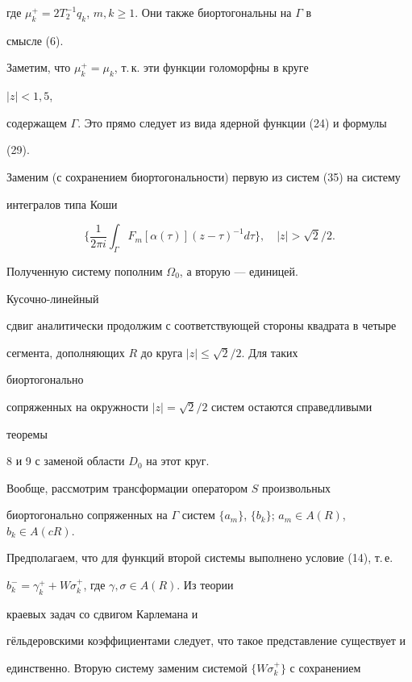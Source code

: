 где $\mu^+_k=2T^{-1}_2q_k$, $m,k\ge1$. Они также биортогональны на $\Gamma$ в 


смысле (6). 


Заметим, что $\mu^+_k=\mu_k$, т.\,к. эти функции голоморфны в круге 


$|z|<1,5$, 


содержащем $\Gamma$. Это прямо следует из вида ядерной функции (24) и формулы 


(29). 


Заменим (с сохранением биортогональности) первую из систем (35) на систему 


интегралов типа Коши 


$$ 


\bigg\{\frac{1}{2\pi i}\int_\Gamma F_m[\alpha(\tau)] 


(z-\tau)^{-1}d\tau\bigg\},\quad |z|>\sqrt{2}/2. 


$$ 


Полученную систему пополним $\Omega_0$, а вторую --- единицей. 


Кусочно-линейный 


сдвиг аналитически продолжим с соответствующей стороны квадрата в четыре 


сегмента, дополняющих $R$ до круга $|z|\le\sqrt{2}/2$. Для таких 


биортогонально 


сопряженных на окружности $|z|=\sqrt{2}/2$ систем остаются справедливыми 


теоремы 


8 и 9 с заменой области $D_0$ на этот круг. 


 


Вообще, рассмотрим трансформации оператором $S$ произвольных 


биортогонально сопряженных на $\Gamma$ систем $\{a_m\}$, $\{b_k\}$; $a_m\in 


A(R)$, $b_k\in A(cR)$. 


Предполагаем, что для функций второй системы выполнено условие (14), т.\,е. 


$b^-_k=\gamma^+_k+W\sigma^+_k$, где $\gamma,\sigma\in A(R)$. Из теории 


краевых задач со сдвигом Карлемана и 


г\"ельдеровскими коэффициентами следует, что такое представление существует и 


единственно. Вторую систему заменим системой $\{W\sigma^+_k\}$ с сохранением 


